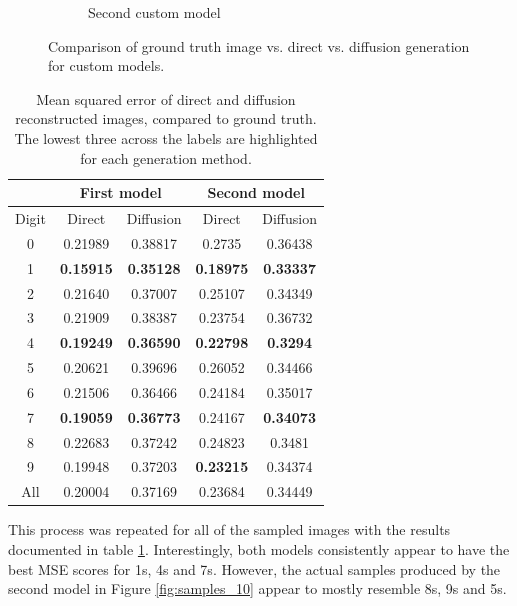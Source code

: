 \documentclass[12pt]{article}
\begin{document}
\begin{figure}[hp]
\begin{subfigure}{0.49\textwidth}
    \caption{Second custom model}
    \label{fig:gt_direct_10}
    \end{subfigure}

    \caption{Comparison of ground truth image vs. direct vs. diffusion generation for custom models.}
    \label{fig:cond_generation}
\end{figure}


\begin{table}[hp]
    \centering
    \begin{tabular}{| c || c | c || c | c |}
        \hline
         & \multicolumn{2}{|c||}{First model} & \multicolumn{2}{|c|}{Second model} \\
        \hline
        Digit & Direct & Diffusion & Direct & Diffusion \\
        \hline
        0 & 0.21989 & 0.38817 & 0.2735 & 0.36438 \\
        \hline
        1 & \textbf{0.15915} & \textbf{0.35128} & \textbf{0.18975} & \textbf{0.33337} \\
        \hline
        2 & 0.21640 & 0.37007 & 0.25107 & 0.34349 \\
        \hline
        3 & 0.21909 & 0.38387 & 0.23754 & 0.36732 \\
        \hline
        4 & \textbf{0.19249} & \textbf{0.36590} & \textbf{0.22798} & \textbf{0.3294} \\
        \hline
        5 & 0.20621 & 0.39696 & 0.26052 & 0.34466 \\
        \hline
        6 & 0.21506 & 0.36466 & 0.24184 & 0.35017 \\
        \hline
        7 & \textbf{0.19059} & \textbf{0.36773} & 0.24167 & \textbf{0.34073} \\
        \hline
        8 & 0.22683 & 0.37242 & 0.24823 & 0.3481 \\
        \hline
        9 & 0.19948 & 0.37203 & \textbf{0.23215} & 0.34374 \\
        \hline
        All & 0.20004 & 0.37169 & 0.23684 & 0.34449 \\
        \hline

    \end{tabular}
    \caption{Mean squared error of direct and diffusion reconstructed images, compared to ground truth. The lowest three across the labels are highlighted for each generation method.}
    \label{tab:mse_reconstruction}
\end{table}

This process was repeated for all of the sampled images with the results documented in table \ref{tab:mse_reconstruction}.
Interestingly, both models consistently appear to have the best MSE scores for 1s, 4s and 7s.
However, the actual samples produced by the second model in Figure \ref{fig:samples_10} appear to mostly resemble 8s, 9s and 5s.
\end{document}
